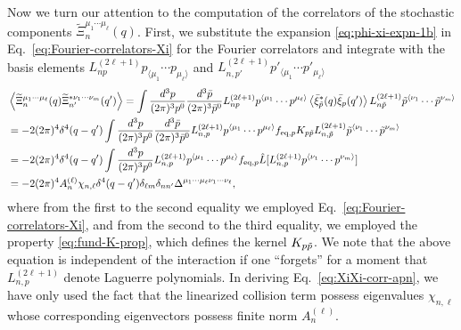 \documentclass[aps,prd,preprint,nofootinbib,amsmath,amssymb,showpacs,longbibliography,singlecolumn,superscriptaddress,10pt]{revtex4-1}
\theoremstyle{plain}
\theoremstyle{definition}
\begin{document}
Now we turn our attention to the computation of the correlators of the stochastic components $\widetilde{\Xi}_{n}^{\mu_{1} \cdots \mu_{\ell}}(q)$. First, we substitute the expansion \eqref{eq:phi-xi-expn-1b} in Eq.~\eqref{eq:Fourier-correlators-Xi} for the Fourier correlators and integrate with the basis elements $L^{(2 \ell + 1)}_{n p} p_{\langle \mu_{1}} \cdots p_{ \mu_{\ell} \rangle}$ and $L^{(2 \ell + 1)}_{n, p'} p'_{\langle \mu_{1}} \cdots p'_{ \mu_{\ell} \rangle}$
%
\begin{equation}
\label{eq:XiXi-corr-apn}
\begin{aligned}
&
\left\langle \widetilde{\Xi}_{n}^{\mu_{1} \cdots \mu_{\ell}}(q) \widetilde{\Xi}_{n'}^{*\nu_{1} \cdots \nu_{m}}(q')
\right\rangle
=
\int \dfrac{d^3 p}{(2\pi)^3 p^0} \dfrac{d^3 \Bar{p}}{(2\pi)^3 \Bar{p}^0}  L^{(2 \ell + 1)}_{n p} p^{\langle \mu_{1}} \cdots p^{ \mu_{\ell} \rangle}
\left\langle \Bar{\xi}^{*}_{\Tilde{p}}(q)
 \Bar{\xi}_p(q')
 \right\rangle
 L^{(2 \ell + 1)}_{n \tilde{p}} \tilde{p}^{\langle \nu_{1}} \cdots \tilde{p}^{ \nu_{m} \rangle}
\\
&
=
- 2 (2 \pi)^{4} \delta^{4}(q-q')
\int \dfrac{d^3 p}{(2\pi)^3 p^0} \dfrac{d^3 \Bar{p}}{(2\pi)^3 \Bar{p}^0} L^{(2 \ell + 1)}_{n,p} p^{\langle \mu_{1}} \cdots p^{ \mu_{\ell} \rangle}
f_{\mathrm{eq},p}K_{p \tilde{p}}
 L^{(2 \ell + 1)}_{n, \tilde{p} } \tilde{p}^{\langle \nu_{1}} \cdots \tilde{p}^{ \nu_{m} \rangle}
\\
&
=
- 2 (2 \pi)^{4} \delta^{4}(q-q')
\int \dfrac{d^3 p}{(2\pi)^3 p^0} L^{(2 \ell + 1)}_{n,p} p^{\langle \mu_{1}} \cdots p^{ \mu_{\ell} \rangle}
f_{\mathrm{eq},p} \Hat{L}[L^{(2 \ell + 1)}_{n, p} p^{\langle \nu_{1}} \cdots p^{ \nu_{m} \rangle}]
\\
&
= 
-2 (2 \pi)^{4} A_{n}^{(\ell)} \chi_{n,\ell}  \delta^{4}(q-q') \delta_{\ell m} \delta_{nn'} \Delta^{\mu_{1} \cdots \mu_{\ell}\nu_{1} \cdots \nu_{\ell}},
\end{aligned}    
\end{equation}
%
where from the first to the second equality we employed Eq.~\eqref{eq:Fourier-correlators-Xi}, and from the second to the third equality, we employed the property \eqref{eq:fund-K-prop}, which defines the kernel $K_{p \Tilde{p}}$. We note that the above equation is independent of the interaction if one ``forgets'' for a moment that $L^{(2 \ell + 1)}_{n,p}$ denote Laguerre polynomials. In deriving Eq.~\eqref{eq:XiXi-corr-apn}, we have only used the fact that the linearized collision term possess eigenvalues $\chi_{n,\ell}$ whose corresponding eigenvectors possess finite norm $A_{n}^{(\ell)}$.
\end{document}
